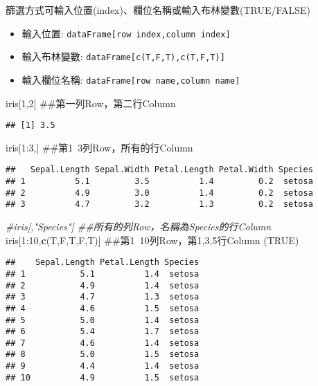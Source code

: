 \documentclass[]{book}
\newenvironment{Shaded}{\begin{snugshade}}{\end{snugshade}}
\newcommand{\KeywordTok}[1]{\textcolor[rgb]{0.13,0.29,0.53}{\textbf{{#1}}}}
\newcommand{\DecValTok}[1]{\textcolor[rgb]{0.00,0.00,0.81}{{#1}}}
\newcommand{\CommentTok}[1]{\textcolor[rgb]{0.56,0.35,0.01}{\textit{{#1}}}}
\newcommand{\NormalTok}[1]{{#1}}
\providecommand{\tightlist}{%
  \setlength{\itemsep}{0pt}\setlength{\parskip}{0pt}}
\begin{document}
篩選方式可輸入位置(index)、欄位名稱或輸入布林變數(TRUE/FALSE)

\begin{itemize}
\tightlist
\item
  輸入位置: \texttt{dataFrame{[}row\ index,column\ index{]}}
\item
  輸入布林變數: \texttt{dataFrame{[}c(T,F,T),c(T,F,T){]}}
\item
  輸入欄位名稱: \texttt{dataFrame{[}row\ name,column\ name{]}}
\end{itemize}

\begin{Shaded}
\begin{Highlighting}[]
\NormalTok{iris[}\DecValTok{1}\NormalTok{,}\DecValTok{2}\NormalTok{] ##第一列Row，第二行Column}
\end{Highlighting}
\end{Shaded}

\begin{verbatim}
## [1] 3.5
\end{verbatim}

\begin{Shaded}
\begin{Highlighting}[]
\NormalTok{iris[}\DecValTok{1}\NormalTok{:}\DecValTok{3}\NormalTok{,] ##第1~3列Row，所有的行Column}
\end{Highlighting}
\end{Shaded}

\begin{verbatim}
##   Sepal.Length Sepal.Width Petal.Length Petal.Width Species
## 1          5.1         3.5          1.4         0.2  setosa
## 2          4.9         3.0          1.4         0.2  setosa
## 3          4.7         3.2          1.3         0.2  setosa
\end{verbatim}

\begin{Shaded}
\begin{Highlighting}[]
\CommentTok{#iris[,"Species"] ##所有的列Row，名稱為Species的行Column}
\NormalTok{iris[}\DecValTok{1}\NormalTok{:}\DecValTok{10}\NormalTok{,}\KeywordTok{c}\NormalTok{(T,F,T,F,T)] ##第1~10列Row，第1,3,5行Column (TRUE)}
\end{Highlighting}
\end{Shaded}

\begin{verbatim}
##    Sepal.Length Petal.Length Species
## 1           5.1          1.4  setosa
## 2           4.9          1.4  setosa
## 3           4.7          1.3  setosa
## 4           4.6          1.5  setosa
## 5           5.0          1.4  setosa
## 6           5.4          1.7  setosa
## 7           4.6          1.4  setosa
## 8           5.0          1.5  setosa
## 9           4.4          1.4  setosa
## 10          4.9          1.5  setosa
\end{verbatim}
\end{document}

